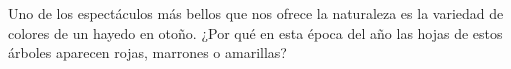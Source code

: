 Uno de los espectáculos más bellos que nos ofrece
la naturaleza es la variedad de colores de un hayedo
en otoño. ¿Por qué en esta época del año las hojas
de estos árboles aparecen rojas, marrones o amarillas?

\begin{solutionbox}{3cm}

\end{solutionbox}